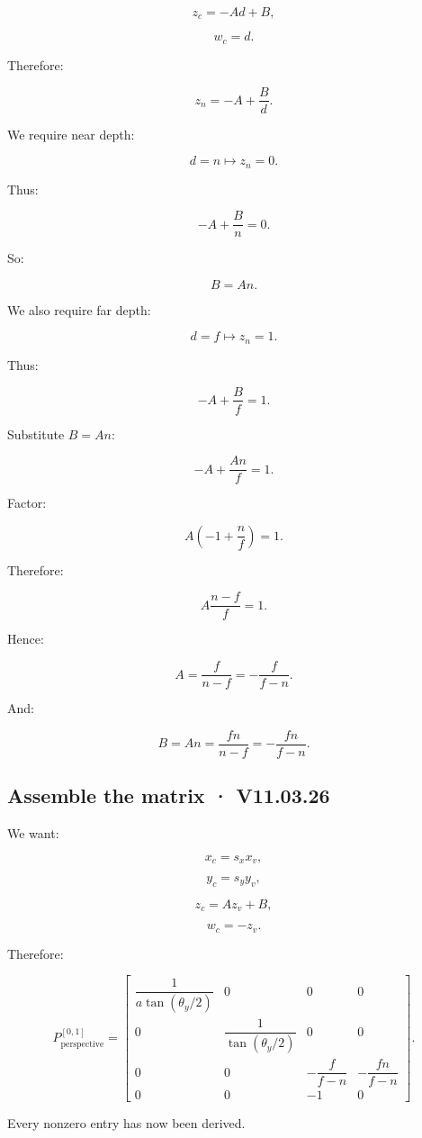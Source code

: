 \[
 z_c=-Ad+B,
\]

\[
 w_c=d.
\]

Therefore:

\[
 \boxed{ z_n=-A+\frac Bd }.
\]

We require near depth:

\[
 d=n\longmapsto z_n=0.
\]

Thus:

\[
 -A+\frac Bn=0.
\]

So:

\[
 \boxed{B=An}.
\]

We also require far depth:

\[
 d=f\longmapsto z_n=1.
\]

Thus:

\[
 -A+\frac Bf=1.
\]

Substitute \(B=An\):

\[
 -A+\frac{An}{f}=1.
\]

Factor:

\[
 A\left(-1+\frac nf\right)=1.
\]

Therefore:

\[
 A\frac{n-f}{f}=1.
\]

Hence:

\[
 \boxed{ A=\frac f{n-f} =-\frac f{f-n} }.
\]

And:

\[
 \boxed{ B=An= \frac{fn}{n-f} =-\frac{fn}{f-n} }.
\]

\subsection{Assemble the matrix · V11.03.26}\label{02-foundations-ii-ch033-assemble-the-matrix-v11.03.26}

We want:

\[
 x_c=s_xx_v,
\]

\[
 y_c=s_yy_v,
\]

\[
 z_c=Az_v+B,
\]

\[
 w_c=-z_v.
\]

Therefore:

\[
 \boxed{ P_{\mathrm{perspective}}^{[0,1]}= \begin{bmatrix} \dfrac1{a\tan(\theta_y/2)}&0&0&0\\ 0&\dfrac1{\tan(\theta_y/2)}&0&0\\ 0&0&-\dfrac f{f-n}&-\dfrac{fn}{f-n}\\ 0&0&-1&0 \end{bmatrix} }.
\]

Every nonzero entry has now been derived.

